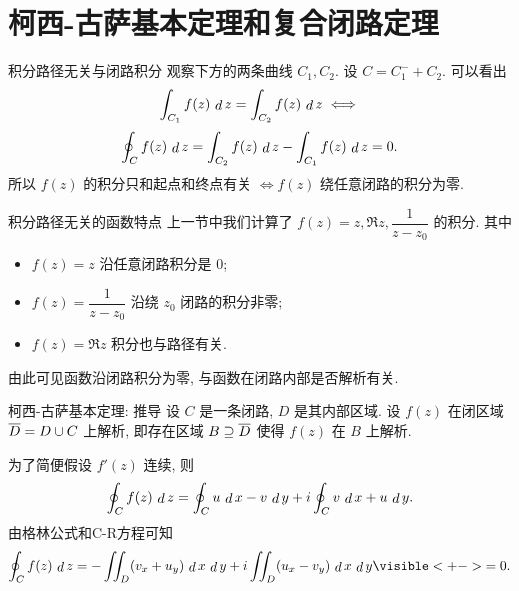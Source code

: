 \section[积分基本定理]{柯西-古萨基本定理和复合闭路定理}


\begin{frame}{积分路径无关与闭路积分}
\onslide<+->
观察下方的两条曲线 $C_1,C_2$.
\onslide<+->
设 $C=C_1^-+C_2$.
\onslide<+->
可以看出
\[\int_{C_1}f(z)\,\mathop{d} z=\int_{C_2}f(z)\,\mathop{d} z\iff\]
\[\oint_Cf(z)\,\mathop{d} z=\int_{C_2}f(z)\,\mathop{d} z-\int_{C_1}f(z)\,\mathop{d} z=0.\]
\onslide<+->
所以 $f(z)$ 的积分只和起点和终点有关 $\iff f(z)$ 绕任意闭路的积分为零.
\begin{center}
\end{center}
\end{frame}


\begin{frame}{积分路径无关的函数特点}
\onslide<+->
上一节中我们计算了 $f(z)=z,\Re z,\dfrac1{z-z_0}$ 的积分.
\onslide<+->
其中
\begin{itemize}
\item $f(z)=z$ 沿任意闭路积分是 $0$;
\item $f(z)=\dfrac1{z-z_0}$ 沿绕 $z_0$ 闭路的积分非零;
\item $f(z)=\Re z$ 积分也与路径有关.
\end{itemize}
\onslide<+->
由此可见函数沿闭路积分为零,
\onslide<+->
与函数在闭路内部是否解析有关.
\end{frame}


\begin{frame}{柯西-古萨基本定理: 推导}
\onslide<+->
设 $C$ 是一条闭路, $D$ 是其内部区域.
\onslide<+->
设 $f(z)$ 在闭区域 $\overline D=D\cup C$ 上解析,
\onslide<+->
即存在区域 $B\supseteq\overline D$ 使得 $f(z)$ 在 $B$ 上解析.

\onslide<+->
为了简便假设 $f'(z)$ 连续,
\onslide<+->
则
\[\oint_Cf(z)\,\mathop{d} z=\oint_Cu\,\mathop{d} x-v\,\mathop{d} y
+i\oint_Cv\,\mathop{d} x+u\,\mathop{d} y.\]
\onslide<+->
由格林公式和C-R方程可知
\[\oint_Cf(z)\diff z=-\iint_D(v_x+u_y)\diff x\diff y
+i\iint_D(u_x-v_y)\diff x\diff y
\visible<+->{=0.}\]
\end{frame}


